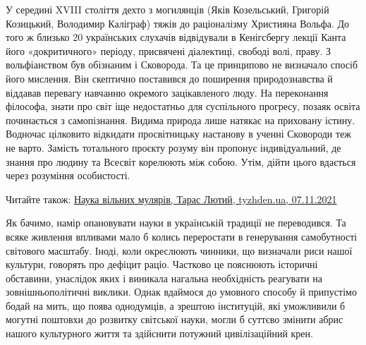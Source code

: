 У середині XVIII століття дехто з могилянців (Яків Козельський, Григорій
Козицький, Володимир Каліграф) тяжів до раціоналізму Християна Вольфа. До того
ж близько 20 українських слухачів відвідували в Кенігсбергу лекції Канта його
«докритичного» періоду, присвячені діалектиці, свободі волі, праву. З
вольфіанством був обізнаним і Сковорода. Та це принципово не визначало спосіб
його мислення. Він скептично поставився до поширення природознавства й віддавав
перевагу навчанню окремого зацікавленого люду. На переконання філософа, знати
про світ іще недостатньо для суспільного прогресу, позаяк освіта починається з
самопізнання. Видима природа лише натякає на приховану істину. Водночас
цілковито відкидати просвітницьку настанову в ученні Сковороди теж не варто.
Замість тотального проєкту розуму він пропонує індивідуальний, де знання про
людину та Всесвіт корелюють між собою. Утім, дійти цього вдається через
розуміння особистості.

Читайте також: \href{https://tyzhden.ua/Columns/50/253562}{Наука вільних %
мулярів, Тарас Лютий, tyzhden.ua, 07.11.2021}

Як бачимо, намір опановувати науки в українській традиції не переводився. Та
всяке живлення впливами мало б колись переростати в генерування самобутності
світового масштабу. Іноді, коли окреслюють чинники, що визначали риси нашої
культури, говорять про дефіцит раціо. Частково це пояснюють історичні
обставини, унаслідок яких і виникала нагальна необхідність реагувати на
зовнішньополітичні виклики. Однак вдаймося до умовного способу й припустімо
бодай на мить, що поява однодумців, а зрештою інституцій, які уможливили б
могутні поштовхи до розвитку світської науки, могли б суттєво змінити абрис
нашого культурного життя та здійснити потужний цивілізаційний крен. 
